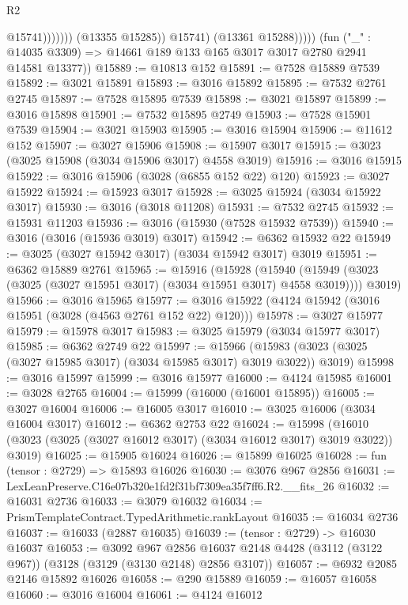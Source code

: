 \begin{lexlean}{R2}
\begin{coremodule}
                                @15741)))))))
                  (@13355 @15285))
                @15741)
              (@13361 @15288)))))
      (fun ("_" : @14035 @3309) => @14661 @189 @133 @165 @3017 @3017 @2780 @2941 @14581 @13377))
@15889 := @10813 @152
@15891 := @7528 @15889 @7539
@15892 := @3021 @15891
@15893 := @3016 @15892
@15895 := @7532 @2761 @2745
@15897 := @7528 @15895 @7539
@15898 := @3021 @15897
@15899 := @3016 @15898
@15901 := @7532 @15895 @2749
@15903 := @7528 @15901 @7539
@15904 := @3021 @15903
@15905 := @3016 @15904
@15906 := @11612 @152
@15907 := @3027 @15906
@15908 := @15907 @3017
@15915 := @3023 (@3025 @15908 (@3034 @15906 @3017) @4558 @3019)
@15916 := @3016 @15915
@15922 := @3016 @15906 (@3028 (@6855 @152 @22) @120)
@15923 := @3027 @15922
@15924 := @15923 @3017
@15928 := @3025 @15924 (@3034 @15922 @3017)
@15930 := @3016 (@3018 @11208)
@15931 := @7532 @2745
@15932 := @15931 @11203
@15936 := @3016 (@15930 (@7528 @15932 @7539))
@15940 := @3016 (@3016 (@15936 @3019) @3017)
@15942 := @6362 @15932 @22
@15949 := @3025 (@3027 @15942 @3017) (@3034 @15942 @3017) @3019
@15951 := @6362 @15889 @2761
@15965 := @15916
    (@15928
      (@15940 (@15949 (@3023 (@3025 (@3027 @15951 @3017) (@3034 @15951 @3017) @4558 @3019))))
      @3019)
@15966 := @3016 @15965
@15977 := @3016 @15922 (@4124 @15942 (@3016 @15951 (@3028 (@4563 @2761 @152 @22) @120)))
@15978 := @3027 @15977
@15979 := @15978 @3017
@15983 := @3025 @15979 (@3034 @15977 @3017)
@15985 := @6362 @2749 @22
@15997 := @15966
    (@15983 (@3023 (@3025 (@3027 @15985 @3017) (@3034 @15985 @3017) @3019 @3022)) @3019)
@15998 := @3016 @15997
@15999 := @3016 @15977
@16000 := @4124 @15985
@16001 := @3028 @2765
@16004 := @15999 (@16000 (@16001 @15895))
@16005 := @3027 @16004
@16006 := @16005 @3017
@16010 := @3025 @16006 (@3034 @16004 @3017)
@16012 := @6362 @2753 @22
@16024 := @15998
    (@16010 (@3023 (@3025 (@3027 @16012 @3017) (@3034 @16012 @3017) @3019 @3022)) @3019)
@16025 := @15905 @16024
@16026 := @15899 @16025
@16028 := fun (tensor : @2729) => @15893 @16026
@16030 := @3076 @967 @2856
@16031 := LexLeanPreserve.C16e07b320e1fd2f31bf7309ea35f7ff6.R2.__fits_26
@16032 := @16031 @2736
@16033 := @3079 @16032
@16034 := PrismTemplateContract.TypedArithmetic.rankLayout
@16035 := @16034 @2736
@16037 := @16033 (@2887 @16035)
@16039 := (tensor : @2729) -> @16030 @16037
@16053 := @3092
    @967
    @2856
    @16037
    @2148
    @4428
    (@3112 (@3122 @967))
    (@3128 (@3129 (@3130 @2148) @2856 @3107))
@16057 := @6932 @2085 @2146 @15892 @16026
@16058 := @290 @15889
@16059 := @16057 @16058
@16060 := @3016 @16004
@16061 := @4124 @16012

\end{coremodule}
\end{lexlean}
